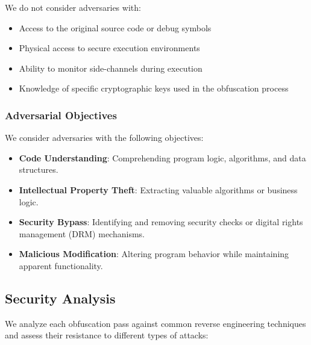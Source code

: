 \documentclass[conference]{IEEEtran}
\begin{document}
We do not consider adversaries with:
\begin{itemize}
    \item Access to the original source code or debug symbols
    \item Physical access to secure execution environments
    \item Ability to monitor side-channels during execution
    \item Knowledge of specific cryptographic keys used in the obfuscation process
\end{itemize}

\subsubsection{Adversarial Objectives}
We consider adversaries with the following objectives:
\begin{itemize}
    \item \textbf{Code Understanding}: Comprehending program logic, algorithms, and data structures.
    \item \textbf{Intellectual Property Theft}: Extracting valuable algorithms or business logic.
    \item \textbf{Security Bypass}: Identifying and removing security checks or digital rights management (DRM) mechanisms.
    \item \textbf{Malicious Modification}: Altering program behavior while maintaining apparent functionality.
\end{itemize}

\subsection{Security Analysis}
We analyze each obfuscation pass against common reverse engineering techniques and assess their resistance to different types of attacks:
\end{document}
